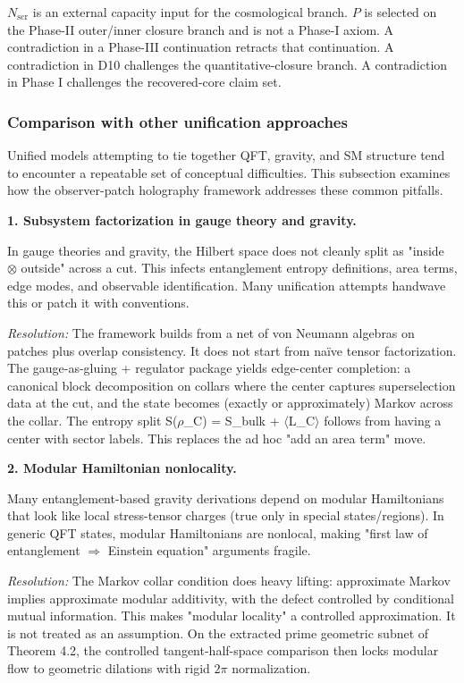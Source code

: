 \(N_{\mathrm{scr}}\) is an external capacity input for the cosmological branch. \(P\) is selected
on the Phase-II outer/inner closure branch and is not a Phase-I axiom. A contradiction in a
Phase-III continuation retracts that continuation. A contradiction in D10 challenges the
quantitative-closure branch. A contradiction in Phase I challenges the recovered-core claim set.

\subsubsection{Comparison with other unification approaches}\label{85-comparison-with-other-unification-approaches}

Unified models attempting to tie together QFT, gravity, and SM structure tend to encounter a repeatable set of conceptual difficulties. This subsection examines how the observer-patch holography framework addresses these common pitfalls.

\textbf{1. Subsystem factorization in gauge theory and gravity.}

In gauge theories and gravity, the Hilbert space does not cleanly split as "inside \ensuremath{\otimes} outside" across a cut. This infects entanglement entropy definitions, area terms, edge modes, and observable identification. Many unification attempts handwave this or patch it with conventions.

\emph{Resolution:} The framework builds from a net of von Neumann algebras on patches plus overlap consistency. It does not start from na\"{i}ve tensor factorization. The gauge-as-gluing + regulator package yields edge-center completion: a canonical block decomposition on collars where the center captures superselection data at the cut, and the state becomes (exactly or approximately) Markov across the collar. The entropy split S(\ensuremath{\rho}\_C) = S\_bulk + \ensuremath{\langle}L\_C\ensuremath{\rangle} follows from having a center with sector labels. This replaces the ad hoc "add an area term" move.

\textbf{2. Modular Hamiltonian nonlocality.}

Many entanglement-based gravity derivations depend on modular Hamiltonians that look like local stress-tensor charges (true only in special states/regions). In generic QFT states, modular Hamiltonians are nonlocal, making "first law of entanglement \ensuremath{\Rightarrow} Einstein equation" arguments fragile.

\emph{Resolution:} The Markov collar condition does heavy lifting: approximate Markov implies approximate modular additivity, with the defect controlled by conditional mutual information. This makes "modular locality" a controlled approximation. It is not treated as an assumption. On the extracted prime geometric subnet of Theorem 4.2, the controlled tangent-half-space comparison then locks modular flow to geometric dilations with rigid \(2\pi\) normalization.

